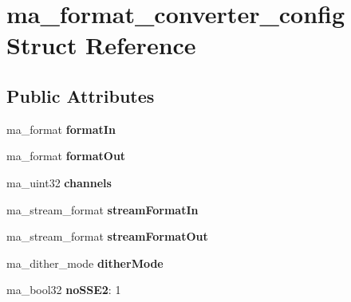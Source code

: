 \hypertarget{structma__format__converter__config}{}\section{ma\+\_\+format\+\_\+converter\+\_\+config Struct Reference}
\label{structma__format__converter__config}
\subsection*{Public Attributes}
\begin{DoxyCompactItemize}
\item 
\mbox{\label{structma__format__converter__config_a211eb84ec195f52525a0c4dfb5b4e0e8}} 
ma\+\_\+format {\bfseries format\+In}
\item 
\mbox{\label{structma__format__converter__config_a1fcc86f12493215cbd864d6e8cb95fb7}} 
ma\+\_\+format {\bfseries format\+Out}
\item 
\mbox{\label{structma__format__converter__config_ad655606cd7a84624503026da2a5c20fa}} 
ma\+\_\+uint32 {\bfseries channels}
\item 
\mbox{\label{structma__format__converter__config_a199f924ce891ae50902ff77b98813633}} 
ma\+\_\+stream\+\_\+format {\bfseries stream\+Format\+In}
\item 
\mbox{\label{structma__format__converter__config_aa0de437ab3e4cdba66075f1e5c24891d}} 
ma\+\_\+stream\+\_\+format {\bfseries stream\+Format\+Out}
\item 
\mbox{\label{structma__format__converter__config_a5a9613dd2399329b5352686bf6e7727d}} 
ma\+\_\+dither\+\_\+mode {\bfseries dither\+Mode}
\item 
\mbox{\label{structma__format__converter__config_a4f16e9213c1a216906b9717e398b6b22}} 
ma\+\_\+bool32 {\bfseries no\+S\+S\+E2}\+: 1
\item 
\mbox{\label{structma__format__converter__config_a3aca78311941f937ecc4a8b315ab91a4}} 

\end{DoxyCompactItemize}
